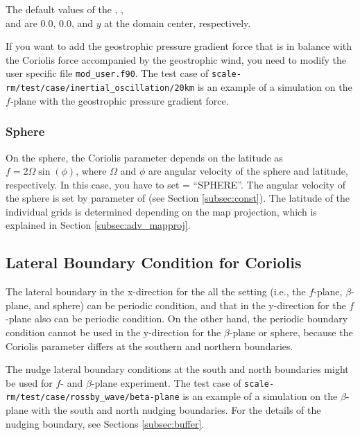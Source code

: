 The default values of the , , \\
and  are 0.0, 0.0, and $y$ at the domain center, respectively.

If you want to add the geostrophic pressure gradient force that is in balance with the Coriolis force accompanied by the geostrophic wind, you need to modify the user specific file \verb|mod_user.f90|. %
The test case of \verb|scale-rm/test/case/inertial_oscillation/20km| is an example of a simulation on the $f$-plane with the geostrophic pressure gradient force.


\subsubsection{Sphere}
On the sphere, the Coriolis parameter depends on the latitude as $f = 2\Omega \sin(\phi)$, where $\Omega$ and $\phi$ are angular velocity of the sphere and latitude, respectively.
In this case, you have to set  = ``SPHERE''.
The angular velocity of the sphere is set by  parameter of  (see Section \ref{subsec:const}).
The latitude of the individual grids is determined depending on the map projection, which is explained in Section \ref{subsec:adv_mapproj}.



\subsection{Lateral Boundary Condition for Coriolis}

The lateral boundary in the x-direction for the all the setting (i.e., the $f$-plane, $\beta$-plane, and sphere) can be periodic condition, and that in the y-direction for the $f$-plane also can be periodic condition.
On the other hand, the periodic boundary condition cannot be used in the y-direction for the $\beta$-plane or sphere, because the Coriolis parameter differs at the southern and northern boundaries.


The nudge lateral boundary conditions at the south and north boundaries might be used for $f$- and $\beta$-plane experiment.
The test case of \verb|scale-rm/test/case/rossby_wave/beta-plane| is an example of a simulation on the $\beta$-plane with the south and north nudging boundaries.
For the details of the nudging boundary, see Sections \ref{subsec:buffer}.


